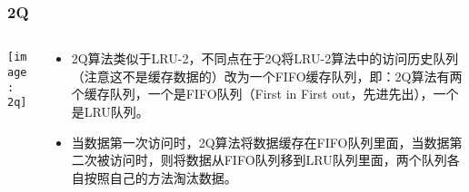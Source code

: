 \begin{frame}[plain]
	\frametitle{2Q}
	\begin{columns}
		\begin{column}{.4\textwidth}
			\centering
			\texttt{[image: 2q]}
		\end{column}
		
		\begin{column}{.6\textwidth}
			
				\begin{itemize}
					
					\item 2Q算法类似于LRU-2，不同点在于2Q将LRU-2算法中的访问历史队列（注意这不是缓存数据的）改为一个FIFO缓存队列，即：2Q算法有两个缓存队列，一个是FIFO队列（First in First out，先进先出），一个是LRU队列。
					\item 当数据第一次访问时，2Q算法将数据缓存在FIFO队列里面，当数据第二次被访问时，则将数据从FIFO队列移到LRU队列里面，两个队列各自按照自己的方法淘汰数据。
				\end{itemize}
		\end{column}
		
		
	\end{columns}
\end{frame}


